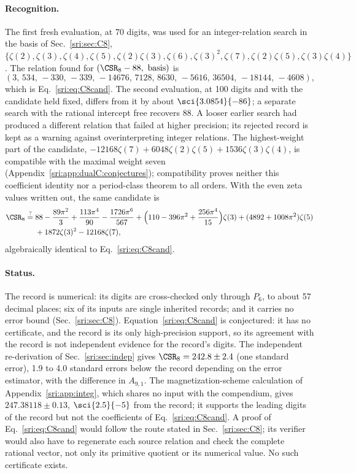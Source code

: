 \paragraph{Recognition.} The first fresh evaluation, at 70 digits, was used for an integer-relation search in the
basis of Sec.~\ref{sri:sec:C8}, $\{\zeta(2),\zeta(3),\zeta(4),\zeta(5),\zeta(2)\zeta(3),\zeta(6),\zeta(3)^2,\zeta(7),
\zeta(2)\zeta(5),\zeta(3)\zeta(4)\}$. The relation found for $(\CSR_8-88,\ \text{basis})$ is
\begin{equation}
 (3,\,534,\,-330,\,-339,\,-14676,\,7128,\,8630,\,-5616,\,36504,\,-18144,\,-4608),
\end{equation}
which is Eq.~\eqref{sri:eq:C8cand}. The second evaluation, at 100 digits and with the candidate held fixed, differs from
it by about $\sci{3.0854}{-86}$; a separate search with the rational intercept free recovers $88$. A looser earlier
search had produced a different relation that failed at higher precision; its rejected record is kept as a warning
against overinterpreting integer relations. The highest-weight part of the candidate,
$-12168\zeta(7)+6048\zeta(2)\zeta(5)+1536\zeta(3)\zeta(4)$, is compatible with the maximal weight seven
(Appendix~\ref{sri:app:dualC:conjectures}); compatibility proves neither this coefficient identity nor a period-class theorem
to all orders. With the even zeta values written out, the same candidate is
\begin{equation}
\begin{aligned}
 \CSR_8\overset{?}{=}{}&88-\frac{89\pi^2}{3}+\frac{113\pi^4}{90}-\frac{1726\pi^6}{567}
 +\Bigl(110-396\pi^2+\frac{256\pi^4}{15}\Bigr)\zeta(3)+(4892+1008\pi^2)\zeta(5)\\
 &+1872\zeta(3)^2-12168\zeta(7),
\end{aligned}
\end{equation}
algebraically identical to Eq.~\eqref{sri:eq:C8cand}.

\paragraph{Status.} The record is numerical: its digits are cross-checked only through $P_6$, to about 57 decimal
places; six of its inputs are single inherited records; and it carries no error bound (Sec.~\ref{sri:sec:C8}).
Equation~\eqref{sri:eq:C8cand} is conjectured: it has no certificate, and the record is its only high-precision support, so its agreement
with the record is not independent evidence for the record's digits. The independent re-derivation of
Sec.~\ref{sri:sec:indep} gives $\CSR_8=242.8\pm2.4$ (one standard error), 1.9 to 4.0 standard errors below the record
depending on the error estimator, with the difference in $A_{9,1}$. The magnetization-scheme calculation of
Appendix~\ref{sri:app:integ}, which shares no input with the compendium, gives $247.38118\pm0.13$, $\sci{2.5}{-5}$ from the
record; it supports the leading digits of the record but not the coefficients of Eq.~\eqref{sri:eq:C8cand}. A proof of
Eq.~\eqref{sri:eq:C8cand} would follow the
route stated in Sec.~\ref{sri:sec:C8}; its verifier would also have to regenerate each source relation and check the
complete rational vector, not only its primitive quotient or its numerical value. No such certificate exists.


